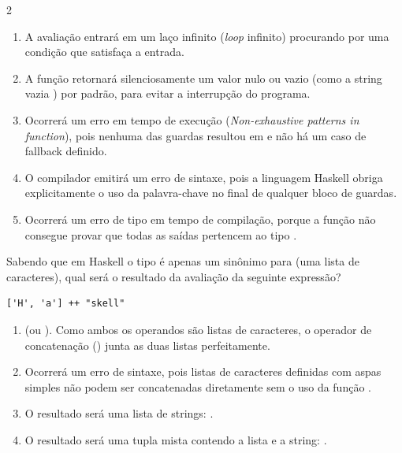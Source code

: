 \documentclass[a4paper,10pt,brazil]{article}
\begin{document}
\begin{multicols}{2}
\begin{enumerate}
  \item A avaliação entrará em um laço infinito (\emph{loop} infinito) procurando por uma condição que satisfaça a entrada.

  \item A função retornará silenciosamente um valor nulo ou vazio (como a string vazia ) por padrão, para evitar a interrupção do programa.

  \item Ocorrerá um erro em tempo de execução (\emph{Non-exhaustive patterns in function}), pois nenhuma das guardas resultou em  e não há um caso de fallback definido.

  \item O compilador emitirá um erro de sintaxe, pois a linguagem Haskell obriga explicitamente o uso da palavra-chave  no final de qualquer bloco de guardas.

  \item Ocorrerá um erro de tipo em tempo de compilação, porque a função não consegue provar que todas as saídas pertencem ao tipo .


\end{enumerate}

Sabendo que em Haskell o tipo  é apenas um sinônimo para \haskellinline{[Char]} (uma lista de caracteres), qual será o resultado da avaliação da seguinte expressão?
\begin{verbatim}
['H', 'a'] ++ "skell"
\end{verbatim}

\begin{enumerate}
  \item {} (ou \haskellinline{['H', 'a', 's', 'k', 'e', 'l', 'l']}). Como ambos os operandos são listas de caracteres, o operador de concatenação (\haskellinline{++}) junta as duas listas perfeitamente.

  \item Ocorrerá um erro de sintaxe, pois listas de caracteres definidas com aspas simples não podem ser concatenadas diretamente sem o uso da função .

  \item O resultado será uma lista de strings: \haskellinline{["Ha", "skell"]}.

  \item O resultado será uma tupla mista contendo a lista e a string: .


\end{enumerate}
\end{multicols}
\end{document}
